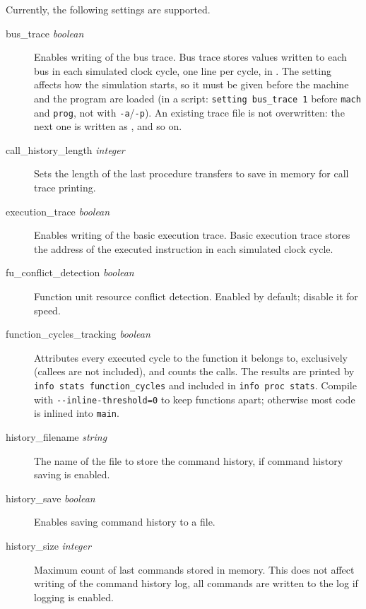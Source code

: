 \documentclass[a4paper,twoside]{tceusermanual}
\begin{document}
Currently, the following settings are supported.

\begin{description}
\item[bus\_trace {\emph{boolean}}] %
  Enables writing of the bus trace. Bus trace stores values written to each bus
in each simulated clock cycle, one line per cycle, in .
The setting affects how the simulation starts, so it must be given before the
machine and the program are loaded (in a script: \texttt{setting bus\_trace 1}
before \texttt{mach} and \texttt{prog}, not with \texttt{-a}/\texttt{-p}).
An existing trace file is not overwritten: the next one is written as
, and so on.

\item[call\_history\_length {\emph{integer}}] %
  Sets the length of the last procedure transfers to save in memory for call
trace printing.

\item[execution\_trace  {\emph{boolean}}] %
  Enables writing of the basic execution trace. Basic execution trace stores the
address of the executed instruction in each simulated clock cycle. 

\item[fu\_conflict\_detection {\emph{boolean}}] %
  Function unit resource conflict detection. Enabled by default; disable it
for speed.

\item[function\_cycles\_tracking {\emph{boolean}}] %
  Attributes every executed cycle to the function it belongs to, exclusively
(callees are not included), and counts the calls. The results are printed by
\texttt{info stats function\_cycles} and included in \texttt{info proc stats}.
Compile with \texttt{-{}-inline-threshold=0} to keep functions apart; otherwise
most code is inlined into \texttt{main}.

\item[history\_filename {\emph{string}}]%
  The name of the file to store the command history, if command history saving
is enabled.

\item[history\_save {\emph{boolean}}] %
  Enables saving command history to a file.

\item[history\_size {\emph{integer}}]%
 Maximum count of last commands stored in memory. This does not affect writing
of the command history log, all commands are written to the log if logging is
enabled.


\end{description}
\end{document}
